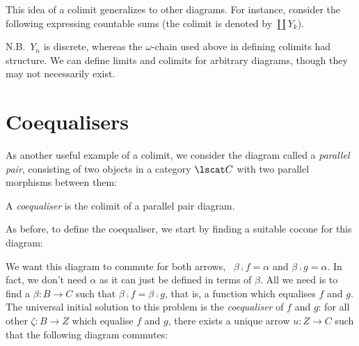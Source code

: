 This idea of a colimit generalizes to other diagrams. For instance, consider the
following expressing countable sums (the colimit is denoted by $\coprod Y_k$).
\begin{center}
\end{center}

N.B.~$Y_n$ is discrete, whereas the $\omega$-chain used above in defining
colimits had structure. We can define limits and colimits for arbitrary
diagrams, though they may not necessarily exist.

\section{Coequalisers}

As another useful example of a colimit, we consider the diagram called a \emph{parallel pair}, consisting of two objects in a category $\lscat C$ with two parallel morphisms between them:

\begin{center}
\end{center}

\begin{definition}[Coequaliser]
A \emph{coequaliser} is the colimit of a parallel pair diagram.
\end{definition}

As before, to define the coequaliser, we start by finding a suitable cocone for
this diagram:

\begin{center}
\end{center}

We want this diagram to commute for both arrows, \ie\ $\beta \comp f = \alpha$
and $\beta \comp g = \alpha$. In fact, we don't need $\alpha$ as it can just be
defined in terms of $\beta$. All we need is to find a $\beta : B \to C$ such
that $\beta \comp f = \beta \comp g$, that is, a function which equalises $f$
and $g$. The universal initial solution to this problem is the
\emph{coequaliser} of $f$ and $g$: for all other $\zeta : B \to Z$ which
equalise $f$ and $g$, there exists a unique arrow $u : Z \to C$ such that the
following diagram commutes:

